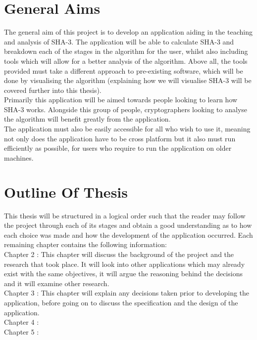\section{General Aims}
The general aim of this project is to develop an application aiding in the teaching and analysis of SHA-3. The application will be able to calculate SHA-3 and breakdown each of the stages in the algorithm for the user, whilst also including tools which will allow for a better analysis of the algorithm. Above all, the tools provided must take a different approach to pre-existing software, which will be done by visualising the algorithm (explaining how we will visualise SHA-3 will be covered further into this thesis).
\vspace{5 mm}\\
Primarily this application will be aimed towards people looking to learn how SHA-3 works. Alongside this group of people, cryptographers looking to analyse the algorithm will benefit greatly from the application.
\vspace{5 mm}\\
The application must also be easily accessible for all who wish to use it, meaning not only does the application have to be cross platform but it also must run efficiently as possible, for users who require to run the application on older machines.
\section{Outline Of Thesis}
This thesis will be structured in a logical order such that the reader may follow the project through each of its stages and obtain a good understanding as to how each choice was made and how the development of the application occurred. Each remaining chapter contains the following information:
\vspace{5 mm}\\
Chapter 2 : This chapter will discuss the background of the project and the research that took place. It will look into other applications which may already exist with the same objectives, it will argue the reasoning behind the decisions and it will examine other research.
\vspace{5 mm}\\
Chapter 3 : This chapter will explain any decisions taken prior to developing the application, before going on to discuss the specification and the design of the application.
\vspace{5 mm}\\
Chapter 4 :
\vspace{5 mm}\\
Chapter 5 :